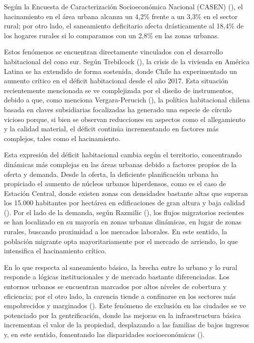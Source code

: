 \documentclass[
  spanish,
  a4paper,
  oneside]{scrbook}
\begin{document}
Según la Encuesta de Caracterización Socioeconómica Nacional (CASEN)
(), el hacinamiento en el área urbana alcanza un 4,2\% frente a un
3,3\% en el sector rural; por otro lado, el saneamiento deficitario
afecta drásticamente al 18,4\% de los hogares rurales si lo comparamos
con un 2,8\% en las zonas urbanas.

Estos fenómenos se encuentran directamente vinculados con el desarrollo
habitacional del cono sur. Según Trebilcock
(), la crisis de la vivienda en
América Latina se ha extendido de forma sostenida, donde Chile ha
experimentado un aumento crítico en el déficit habitacional desde el año
2017. Esta situación recientemente mencionada se ve complejizada por el
diseño de instrumentos, debido a que, como menciona Vergara-Perucich
(), la política habitacional chilena
basada en claves subsidiarias focalizadas ha generado una especie de
círculo vicioso porque, si bien se observan reducciones en aspectos como
el allegamiento y la calidad material, el déficit continúa incrementando
en factores más complejos, tales como el hacinamiento.

Esta expresión del déficit habitacional cambia según el territorio,
concentrando dinámicas más complejas en las áreas urbanas debido a
factores propios de la oferta y demanda. Desde la oferta, la deficiente
planificación urbana ha propiciado el aumento de núcleos urbanos
hiperdensos, como es el caso de Estación Central, donde existen zonas
con densidades bastante altas que superan los 15.000 habitantes por
hectárea en edificaciones de gran altura y baja calidad
(). Por el lado de la
demanda, según Razmilic (), los flujos
migratorios recientes se han localizado en su mayoría en zonas urbanas
dinámicas, en lugar de zonas rurales, buscando proximidad a los mercados
laborales. En este sentido, la población migrante opta mayoritariamente
por el mercado de arriendo, lo que intensifica el hacinamiento crítico.

En lo que respecta al saneamiento básico, la brecha entre lo urbano y lo
rural responde a lógicas institucionales y de mercado bastante
diferenciadas. Los entornos urbanos se encuentran marcados por altos
niveles de cobertura y eficiencia; por el otro lado, la carencia tiende
a confinarse en los sectores más empobrecidos y marginados
(). Este fenómeno de exclusión
en las ciudades se ve potenciado por la gentrificación, donde las
mejoras en la infraestructura básica incrementan el valor de la
propiedad, desplazando a las familias de bajos ingresos y, en este
sentido, fomentando las disparidades socioeconómicas
().
\end{document}
